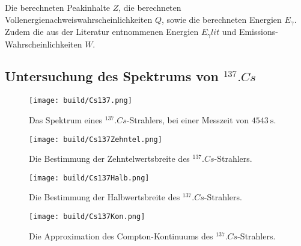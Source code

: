 \begin{table}
	\centering
	\caption{Die berechneten Peakinhalte $Z$, die berechneten Vollenergienachweiswahrscheinlichkeiten $Q$, sowie die berechneten Energien $E_\gamma$. Zudem die aus der Literatur entnommenen Energien $E_\gamma^.{lit}$ und Emissions-Wahrscheinlichkeiten $W$.}
	
	\label{tab:Q}
\end{table}

\subsection{Untersuchung des Spektrums von $^{137}.{Cs}$}

\begin{figure}
	\centering
	\texttt{[image: build/Cs137.png]}
	\caption{Das Spektrum eines $^{137}.{Cs}$-Strahlers, bei einer Messzeit von $\SI{4543}{\second}$.}
	\label{fig:SpektrumCs}
\end{figure}

%	

\begin{figure}
	\centering
	\texttt{[image: build/Cs137Zehntel.png]}
	\caption{Die Bestimmung der Zehntelwertsbreite des $^{137}.{Cs}$-Strahlers.}
	\label{fig:10tel}
\end{figure}

\begin{figure}
	\centering
	\texttt{[image: build/Cs137Halb.png]}
	\caption{Die Bestimmung der Halbwertsbreite des $^{137}.{Cs}$-Strahlers.}
	\label{fig:2tel}
\end{figure}

%	

\begin{figure}
	\centering
	\texttt{[image: build/Cs137Kon.png]}
	\caption{Die Approximation des Compton-Kontinuums des $^{137}.{Cs}$-Strahlers.}
	\label{fig:Comptonkontinuum}
\end{figure}


